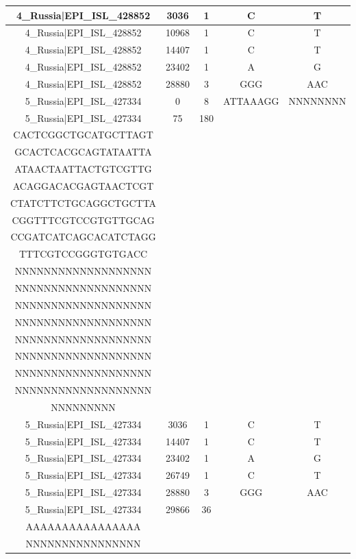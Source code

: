 \documentclass[a4paper,10pt]{article}
\begin{document}
\begin{longtable}{@{}ccccc@{}}
4\_Russia|EPI\_ISL\_428852 & 3036 & 1 & C & T \\* \midrule
4\_Russia|EPI\_ISL\_428852 & 10968 & 1 & C & T \\* \midrule
4\_Russia|EPI\_ISL\_428852 & 14407 & 1 & C & T \\* \midrule
4\_Russia|EPI\_ISL\_428852 & 23402 & 1 & A & G \\* \midrule
4\_Russia|EPI\_ISL\_428852 & 28880 & 3 & GGG & AAC \\* \midrule
5\_Russia|EPI\_ISL\_427334 & 0 & 8 & ATTAAAGG & NNNNNNNN \\* \midrule
5\_Russia|EPI\_ISL\_427334 & 75 & 180 & \begin{tabular}[c]{@{}c@{}}TTTAAAATCTGTGTGGCTGT\\ CACTCGGCTGCATGCTTAGT\\ GCACTCACGCAGTATAATTA\\ ATAACTAATTACTGTCGTTG\\ ACAGGACACGAGTAACTCGT\\ CTATCTTCTGCAGGCTGCTTA\\ CGGTTTCGTCCGTGTTGCAG\\ CCGATCATCAGCACATCTAGG\\ TTTCGTCCGGGTGTGACC\end{tabular} & \begin{tabular}[c]{@{}c@{}}NNNNNNNNNNNNNNNNNNN\\ NNNNNNNNNNNNNNNNNNN\\ NNNNNNNNNNNNNNNNNNN\\ NNNNNNNNNNNNNNNNNNN\\ NNNNNNNNNNNNNNNNNNN\\ NNNNNNNNNNNNNNNNNNN\\ NNNNNNNNNNNNNNNNNNN\\ NNNNNNNNNNNNNNNNNNN\\ NNNNNNNNNNNNNNNNNNN\\ NNNNNNNNN\end{tabular} \\* \midrule
5\_Russia|EPI\_ISL\_427334 & 3036 & 1 & C & T \\* \midrule
5\_Russia|EPI\_ISL\_427334 & 14407 & 1 & C & T \\* \midrule
5\_Russia|EPI\_ISL\_427334 & 23402 & 1 & A & G \\* \midrule
5\_Russia|EPI\_ISL\_427334 & 26749 & 1 & C & T \\* \midrule
5\_Russia|EPI\_ISL\_427334 & 28880 & 3 & GGG & AAC \\* \midrule
5\_Russia|EPI\_ISL\_427334 & 29866 & 36 & \begin{tabular}[c]{@{}c@{}}GACAAAAAAAAAAAAAAAAA\\ AAAAAAAAAAAAAAAA\end{tabular} & \begin{tabular}[c]{@{}c@{}}NNNNNNNNNNNNNNNNNNNN\\ NNNNNNNNNNNNNNNN\end{tabular} \\* \midrule

\end{longtable}
\end{document}
